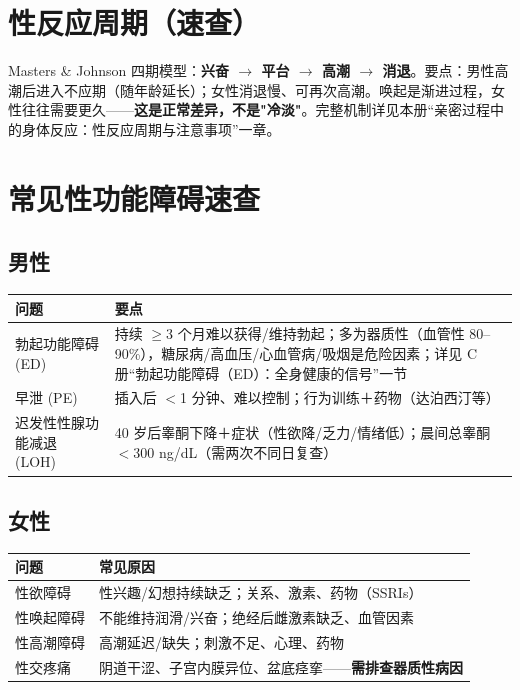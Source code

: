 \documentclass[12pt,UTF8,openany]{ctexbook}
\begin{document}
\section{性反应周期（速查）}

Masters \& Johnson 四期模型：\textbf{兴奋 $\to$ 平台 $\to$ 高潮 $\to$ 消退}。要点：男性高潮后进入不应期（随年龄延长）；女性消退慢、可再次高潮。唤起是渐进过程，女性往往需要更久——\textbf{这是正常差异，不是"冷淡"}。完整机制详见本册“亲密过程中的身体反应：性反应周期与注意事项”一章。

\section{常见性功能障碍速查}

\subsection*{男性}

\begin{tabularx}{\textwidth}{lX}
\toprule
问题 & 要点 \\
\midrule
勃起功能障碍 (ED) & 持续 $\ge$3 个月难以获得/维持勃起；多为器质性（血管性 80--90\%），糖尿病/高血压/心血管病/吸烟是危险因素；详见 C 册“勃起功能障碍（ED）：全身健康的信号”一节 \\
早泄 (PE) & 插入后 $<$1 分钟、难以控制；行为训练＋药物（达泊西汀等） \\
迟发性性腺功能减退 (LOH) & 40 岁后睾酮下降＋症状（性欲降/乏力/情绪低）；晨间总睾酮 $<$300 ng/dL（需两次不同日复查） \\
\bottomrule
\end{tabularx}

\subsection*{女性}

\begin{tabularx}{\textwidth}{lX}
\toprule
问题 & 常见原因 \\
\midrule
性欲障碍 & 性兴趣/幻想持续缺乏；关系、激素、药物（SSRIs） \\
性唤起障碍 & 不能维持润滑/兴奋；绝经后雌激素缺乏、血管因素 \\
性高潮障碍 & 高潮延迟/缺失；刺激不足、心理、药物 \\
性交疼痛 & 阴道干涩、子宫内膜异位、盆底痉挛——\textbf{需排查器质性病因} \\
\bottomrule
\end{tabularx}
\end{document}
